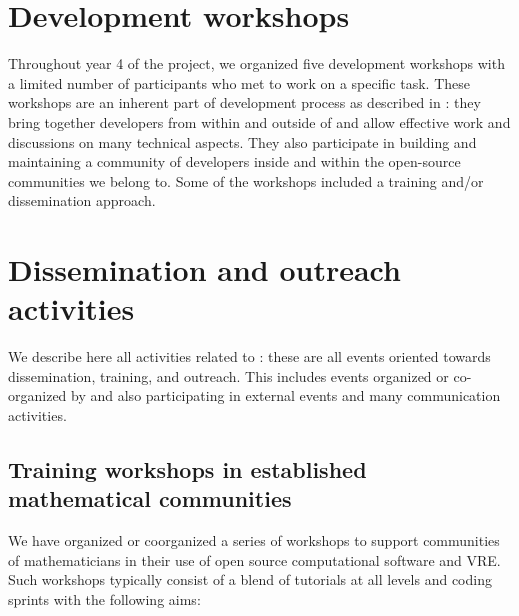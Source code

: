 \documentclass{deliverablereport}
\author{Viviane Pons et al.}
\begin{document}
\maketitle
\githubissuedescription
\newpage
\tableofcontents
\newpage

\section{Development workshops}

Throughout year 4 of the project, we organized five development
workshops with a limited number of participants who met to work on a
specific task. These workshops are an inherent part of \ODK
development process as described in :
they bring together developers from within and outside of \ODK and
allow effective work and discussions on many technical aspects. They
also participate in building and maintaining a community of developers
inside \ODK and within the open-source communities we belong to. Some
of the workshops included a training and/or dissemination approach.













\section{Dissemination and outreach activities}

We describe here all activities related to :
these are all events oriented towards dissemination, training, and outreach. This
includes events organized or co-organized by \ODK and also
participating in external events and many communication activities.

\subsection{Training workshops in established mathematical communities}

We have organized or coorganized a series of workshops to support
communities of mathematicians in their use of open source
computational software and VRE. Such workshops typically consist of a
blend of tutorials at all levels and coding sprints with the following
aims:
\end{document}
